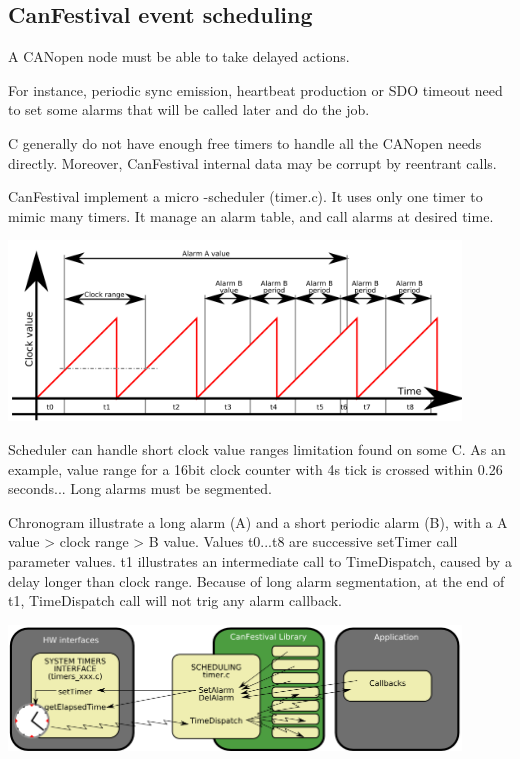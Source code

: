 \documentclass[12pt,english,a4paper]{book}
\newcommand{\canopen}{CANopen }
\begin{document}
\subsection{CanFestival event scheduling}

A \canopen node must be able to take delayed actions.

For instance, periodic sync emission, heartbeat production or SDO timeout
need to set some alarms that will be called later and do the job.

{\textmu}C generally do not have enough free timers to handle all
the \canopen needs directly. Moreover, CanFestival internal data
may be corrupt by reentrant calls.

CanFestival implement a micro -scheduler (timer.c). It uses only one
timer to mimic many timers. It manage an alarm table, and call alarms
at desired time.

\begin{center}
\includegraphics[width=12cm]{Pictures/100000000000022C000000DEDAD2140C} 
\par\end{center}

Scheduler can handle short clock value ranges limitation found on
some {\textmu}C. As an example, value range for a 16bit clock counter
with 4{\textmu}s tick is crossed within 0.26 seconds... Long alarms
must be segmented.

Chronogram illustrate a long alarm (A) and a short periodic alarm
(B), with a A value {\textgreater} clock range {\textgreater}
B value. Values t0...t8 are successive setTimer call parameter values.
t1 illustrates an intermediate call to TimeDispatch, caused by a delay
longer than clock range. Because of long alarm segmentation, at the
end of t1, TimeDispatch call will not trig any alarm callback.

\begin{center}
\includegraphics[width=12cm]{Pictures/1000000000000396000000FFC42573DA} 
\par\end{center}
\end{document}
